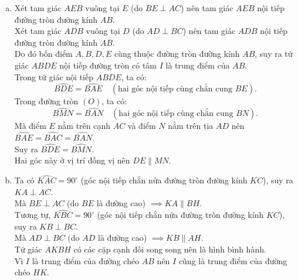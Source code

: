 \begin{bt}
{\begin{center}
	\end{center}
	\begin{enumerate}[a)]
		\item Xét tam giác $AEB$ vuông tại $E$ (do $BE \perp AC$) nên tam giác $AEB$ nội tiếp đường tròn đường kính $AB$.\\
		Xét tam giác $ADB$ vuông tại $D$ (do $AD \perp BC$) nên tam giác $ADB$ nội tiếp đường tròn đường kính $AB$.\\
		Do đó bốn điểm $A, B, D, E$ cùng thuộc đường tròn đường kính $AB$, suy ra tứ giác $ABDE$ nội tiếp đường tròn có tâm $I$ là trung điểm của $AB$.\\
		Trong tứ giác nội tiếp $ABDE$, ta có:
		$$\widehat{BDE} = \widehat{BAE} \quad (\text{hai góc nội tiếp cùng chắn cung } BE).$$
		Trong đường tròn $(O)$, ta có:
		$$\widehat{BMN} = \widehat{BAN} \quad (\text{hai góc nội tiếp cùng chắn cung } BN).$$
		Mà điểm $E$ nằm trên cạnh $AC$ và điểm $N$ nằm trên tia $AD$ nên $\widehat{BAE} = \widehat{BAC} = \widehat{BAN}$.\\
		Suy ra $\widehat{BDE} = \widehat{BMN}$.\\
		Hai góc này ở vị trí đồng vị nên $DE \parallel MN$.
		\item Ta có $\widehat{KAC} = 90^\circ$ (góc nội tiếp chắn nửa đường tròn đường kính $KC$), suy ra $KA \perp AC$.\\
		Mà $BE \perp AC$ (do $BE$ là đường cao) $\implies KA \parallel BH$.\\
		Tương tự, $\widehat{KBC} = 90^\circ$ (góc nội tiếp chắn nửa đường tròn đường kính $KC$), suy ra $KB \perp BC$.\\
		Mà $AD \perp BC$ (do $AD$ là đường cao) $\implies KB \parallel AH$.\\
		Tứ giác $AKBH$ có các cặp cạnh đối song song nên là hình bình hành.\\
		Vì $I$ là trung điểm của đường chéo $AB$ nên $I$ cũng là trung điểm của đường chéo $HK$.\\

\end{enumerate}}
\end{bt}
